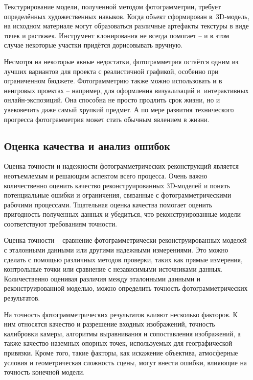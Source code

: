 \documentclass{ou}
\begin{document}
Текстурирование модели, полученной методом фотограмметрии, требует определённых художественных навыков. Когда объект сформирован в~3D-модель, на исходном материале могут образоваться различные артефакты текстуры в виде точек и растяжек. Инструмент клонирования не всегда помогает -- и в этом случае некоторые участки придётся дорисовывать вручную\cite{skillbox_fotogrammetriya}.

Несмотря на некоторые явные недостатки, фотограмметрия остаётся одним из лучших вариантов для проекта с реалистичной графикой, особенно при ограниченном бюджете. Фотограмметрию также можно использовать и в неигровых проектах -- например, для оформления визуализаций и~интерактивных онлайн-экспозиций. Она способна не просто продлить срок жизни, но и увековечить даже самый хрупкий предмет. А по мере развития технического прогресса фотограмметрия может стать обычным явлением в жизни\cite{incredibleart}.
\subsection{Оценка качества и анализ ошибок}
Оценка точности и надежности фотограмметрических реконструкций является неотъемлемым и решающим аспектом всего процесса. Очень важно количественно оценить качество реконструированных 3D-моделей и понять потенциальные ошибки и ограничения, связанные с фотограмметрическими рабочими процессами. Тщательная оценка качества помогает оценить пригодность полученных данных и убедиться, что реконструированные модели соответствуют требованиям точности\cite{sushentsov_2023}.

Оценка точности -- сравнение фотограмметрически реконструированных моделей с эталонными данными или другими надежными измерениями. Это можно сделать с помощью различных методов проверки, таких как прямые измерения, контрольные точки или сравнение с независимыми источниками данных. Количественно оценивая различия между эталонными данными и реконструированной моделью, можно определить точность фотограмметрических результатов.

На точность фотограмметрических результатов влияют несколько факторов. К ним относятся качество и разрешение входных изображений, точность калибровки камеры, алгоритмы выравнивания и сопоставления изображений, а также качество наземных опорных точек, используемых для географической привязки. Кроме того, такие факторы, как искажение объектива, атмосферные условия и геометрическая сложность сцены, могут внести ошибки, влияющие на точность конечной модели.
\end{document}
